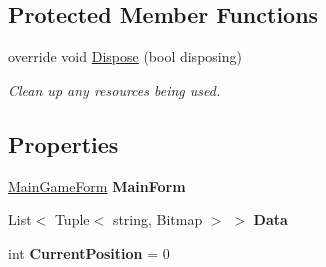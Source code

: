 \subsection*{Protected Member Functions}
\begin{DoxyCompactItemize}
\item 
override void \mbox{\hyperlink{class_chess_tracking_1_1_user_interface_1_1_calibration_snapshot_form_a86904b3c1fa6b9a0a9bd045f20f5d15b}{Dispose}} (bool disposing)
\begin{DoxyCompactList}\small\item\em Clean up any resources being used. \end{DoxyCompactList}\end{DoxyCompactItemize}
\subsection*{Properties}
\begin{DoxyCompactItemize}
\item 
\mbox{\label{class_chess_tracking_1_1_user_interface_1_1_calibration_snapshot_form_abe029793259c0be9dbab725ff80ae0ec}} 
\mbox{\hyperlink{class_chess_tracking_1_1_user_interface_1_1_main_game_form}{Main\+Game\+Form}} {\bfseries Main\+Form}
\item 
\mbox{\label{class_chess_tracking_1_1_user_interface_1_1_calibration_snapshot_form_a8c701750196d674a1296f9e3636614e3}} 
List$<$ Tuple$<$ string, Bitmap $>$ $>$ {\bfseries Data}
\item 
\mbox{\label{class_chess_tracking_1_1_user_interface_1_1_calibration_snapshot_form_a8c00c816cfd70ad113b59408bbb846b7}} 
int {\bfseries Current\+Position} = 0
\end{DoxyCompactItemize}
